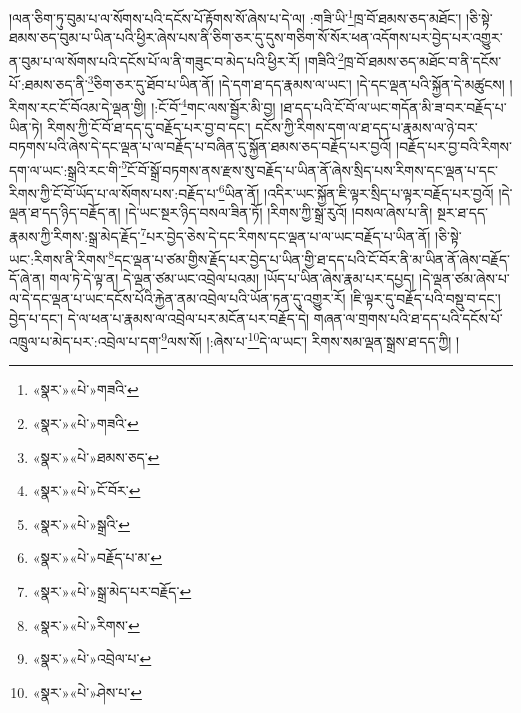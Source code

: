 །ལན་ཅིག་ཏུ་བུམ་པ་ལ་སོགས་པའི་དངོས་པོ་རྟོགས་སོ་ཞེས་པ་དེ་ལ། :གཟི་ཡི་\footnote{«སྣར་»«པེ་»གཟའི་}ཁྲ་བོ་ཐམས་ཅད་མཐོང་། །ཅི་སྟེ་ཐམས་ཅད་བུམ་པ་ཡིན་པའི་ཕྱིར་ཞེས་པས་ནི་ཅིག་ཅར་དུ་དུས་གཅིག་སོ་སོར་ཕན་འདོགས་པར་བྱེད་པར་འགྱུར་ན་བུམ་པ་ལ་སོགས་པའི་དངོས་པོ་ལ་ནི་གཟུང་བ་མེད་པའི་ཕྱིར་རོ། །གཟིའི་\footnote{«སྣར་»«པེ་»གཟའི་}ཁྲ་བོ་ཐམས་ཅད་མཐོང་བ་ནི་དངོས་པོ་:ཐམས་ཅད་ནི་\footnote{«སྣར་»«པེ་»ཐམས་ཅད་}ཅིག་ཅར་དུ་ཐོབ་པ་ཡིན་ནོ། །དེ་དག་ཐ་དད་རྣམས་ལ་ཡང་། །དེ་དང་ལྡན་པའི་སྐྱོན་དེ་མཚུངས། །རིགས་རང་ངོ་བོའམ་དེ་ལྡན་གྱི། །:ངོ་བོ་\footnote{«སྣར་»«པེ་»ངོ་བོར་}གང་ལས་སྦྱོར་མི་བྱ། །ཐ་དད་པའི་ངོ་བོ་ལ་ཡང་གདོན་མི་ཟ་བར་བརྗོད་པ་ཡིན་ཏེ། རིགས་ཀྱི་ངོ་བོ་ཐ་དད་དུ་བརྗོད་པར་བྱ་བ་དང་། དངོས་ཀྱི་རིགས་དག་ལ་ཐ་དད་པ་རྣམས་ལ་ཉེ་བར་བཏགས་པའི་ཞེས་དེ་དང་ལྡན་པ་ལ་བརྗོད་པ་བཞིན་དུ་སྐྱོན་ཐམས་ཅད་བརྗོད་པར་བྱའོ། །བརྗོད་པར་བྱ་བའི་རིགས་དག་ལ་ཡང་:སྒྲའི་རང་གི་\footnote{«སྣར་»«པེ་»སྒྲའི་}ངོ་བོ་སྒྲོ་བཏགས་ནས་རྫས་སུ་བརྗོད་པ་ཡིན་ནོ་ཞེས་སྲིད་པས་རིགས་དང་ལྡན་པ་དང་རིགས་ཀྱི་ངོ་བོ་ཡོད་པ་ལ་སོགས་པས་:བརྗོད་པ་\footnote{«སྣར་»«པེ་»བརྗོད་པ་མ་}ཡིན་ནོ། །འདིར་ཡང་སྐྱོན་ཇི་ལྟར་སྲིད་པ་ལྟར་བརྗོད་པར་བྱའོ། །དེ་ལྡན་ཐ་དད་ཉིད་བརྗོད་ན། །དེ་ཡང་སྔར་ཉིད་བསལ་ཟིན་ཏོ། །རིགས་ཀྱི་སྒྲ་རུའོ། །བསལ་ཞེས་པ་ནི། སྔར་ཐ་དད་རྣམས་ཀྱི་རིགས་:སྒྲ་མེད་རྗོད་\footnote{«སྣར་»«པེ་»སྒྲ་མེད་པར་བརྗོད་}པར་བྱེད་ཅེས་དེ་དང་རིགས་དང་ལྡན་པ་ལ་ཡང་བརྗོད་པ་ཡིན་ནོ། །ཅི་སྟེ་ཡང་:རིགས་ནི་རིགས་\footnote{«སྣར་»«པེ་»རིགས་}དང་ལྡན་པ་ཙམ་གྱིས་རྗོད་པར་བྱེད་པ་ཡིན་གྱི་ཐ་དད་པའི་ངོ་བོར་ནི་མ་ཡིན་ནོ་ཞེས་བརྗོད་དོ་ཞེ་ན། གལ་ཏེ་དེ་ལྟ་ན། དེ་ལྡན་ཙམ་ཡང་འབྲེལ་པའམ། །ཡོད་པ་ཡིན་ཞེས་རྣམ་པར་དཔྱད། །དེ་ལྡན་ཙམ་ཞེས་པ་ལ་དེ་དང་ལྡན་པ་ཡང་དངོས་པོའི་རྐྱེན་ནམ་འབྲེལ་པའི་ཡོན་ཏན་དུ་འགྱུར་རོ། །ཇི་ལྟར་དུ་བརྗོད་པའི་བསྡུ་བ་དང་། བྱེད་པ་དང་། དེ་ལ་ཕན་པ་རྣམས་ལ་འབྲེལ་པར་མངོན་པར་བརྗོད་དེ། གཞན་ལ་གྲགས་པའི་ཐ་དད་པའི་དངོས་པོ་འཁྲུལ་པ་མེད་པར་:འབྲེལ་པ་དག་\footnote{«སྣར་»«པེ་»འབྲེལ་པ་}ལས་སོ། །:ཞེས་པ་\footnote{«སྣར་»«པེ་»ཤེས་པ་}དེ་ལ་ཡང་། རིགས་སམ་ལྡན་སྒྲས་ཐ་དད་ཀྱི། །
